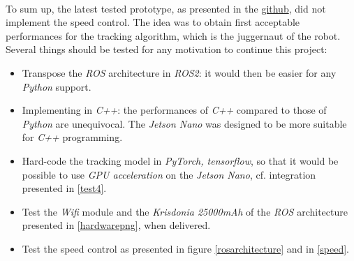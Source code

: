 \\\indent To sum up, the latest tested prototype, as presented in the \href{https://github.com/klipfel/tracker-v1}{github},
did not implement the speed control. The idea was to obtain first acceptable performances
for the tracking algorithm, which is the juggernaut of the robot. Several 
things should be tested for any motivation to continue this project:
\begin{itemize}
	\item[\textbullet] Transpose the \textit{ROS} architecture in \textit{ROS2}: it would then 
	be easier for any \textit{Python} support.
	\item[\textbullet] Implementing in \textit{C++}: the performances of
	\textit{C++} compared to those of \textit{Python} are unequivocal. The \textit{Jetson Nano}
	was designed to be more suitable for \textit{C++} programming.
	\item[\textbullet] Hard-code the tracking model in \textit{PyTorch, tensorflow}, so that 
	it would be possible to use \textit{GPU acceleration} on the \textit{Jetson Nano}, cf. 
	integration presented in \vref{test4}.
	\item[\textbullet] Test the \textit{Wifi} module and the \textit{Krisdonia 25000mAh}
	of the \textit{ROS} architecture 
	presented in \vref{hardwarepng}, when delivered.
	\item[\textbullet] Test the speed control as presented in figure \vref{rosarchitecture} and in \vref{speed}.
\end{itemize}